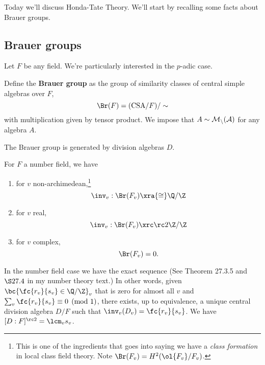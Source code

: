 
Today we'll discuss Honda-Tate Theory. 
We'll start by recalling some facts about Brauer groups.

\subsection{Brauer groups}

Let $F$ be any field. We're particularly interested in the $p$-adic case.
\begin{df}
Define the \textbf{Brauer group} as the group of similarity classes of central simple algebras over $F$, 
\[
\Br(F)=(\text{CSA}/F)/\sim
\]
with multiplication given by tensor product. We impose that $A\sim \cal M_n(A)$ for any algebra $A$.
\end{df}
The Brauer group is generated by division algebras $D$. %

For $F$ a number field, we have
\begin{enumerate}
\item
for $v$ non-archimedean,\footnote{This is one of the ingredients that goes into saying we have a {\it class formation} in local class field theory. Note $\Br(F_v)=H^2(\ol{F_v}/F_v)$.}
\[
\inv_v:\Br(F_v)\xra{\cong} \Q/\Z
\]
\item
for $v$ real,
\[
\inv_v:\Br(F_v)\xrc \rc2\Z/\Z
\]
\item
for $v$ complex,
\[
\Br(F_v)=0.
\]
\end{enumerate}

In the number field case we have the exact sequence (See Theorem 27.3.5 and $\S27.4$ in my number theory text.)
\eeq
In other words, given $\bc{\fc{r_v}{s_v}\in \Q/\Z}_v$ that is zero for almost all $v$ and $\sum_v \fc{r_v}{s_v}\equiv 0\pmod 1$, there exists, up to equivalence, a unique central division algebra $D/F$ such that $\inv_v(D_v)=\fc{r_v}{s_v}$. We have $[D:F]^{\rc 2}=\lcm_v s_v$. %

